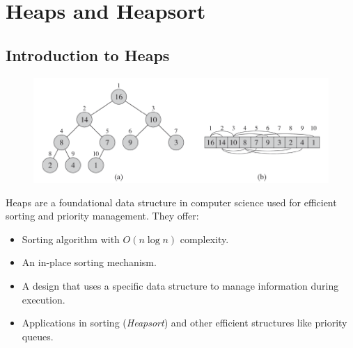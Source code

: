 \chapter{Heaps and Heapsort}

\section{Introduction to Heaps}
\begin{figure}[h!]
    \centering
    \includegraphics[width=0.75\linewidth]{immagini/heap1.png}
\end{figure}
Heaps are a foundational data structure in computer science used for efficient sorting and priority management. They offer:
\begin{itemize}
    \item Sorting algorithm with \( O(n \log n) \) complexity.
    \item An in-place sorting mechanism.
    \item A design that uses a specific data structure to manage information during execution.
    \item Applications in sorting (\textit{Heapsort}) and other efficient structures like priority queues.
\end{itemize}

